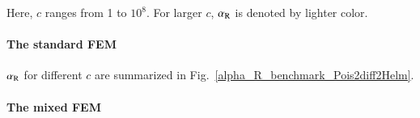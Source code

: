 \documentclass[review,3p]{elsarticle}
\begin{document}
Here, $c$ ranges from 1 to $10^8$.
For larger $c$, $\alpha_{\rm R}$ is denoted by lighter color.

\paragraph{The standard FEM}
$\alpha_{\rm R}$ for different $c$ are summarized in Fig.~\ref{alpha_R_benchmark_Pois2diff2Helm}.

\paragraph{The mixed FEM}

%
%
%
\newpage
\end{document}
